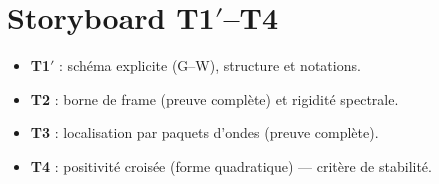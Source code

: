 \section{\texorpdfstring{Storyboard T1$′$–T4}{Storyboard T1′–T4}}
\begin{itemize}\setlength\itemsep{2pt}
\item \textbf{T1$'$} : schéma explicite (G–W), structure et notations.
\item \textbf{T2} : borne de frame (preuve complète) et rigidité spectrale.
\item \textbf{T3} : localisation par paquets d’ondes (preuve complète).
\item \textbf{T4} : positivité croisée (forme quadratique) — critère de stabilité.
\end{itemize}
